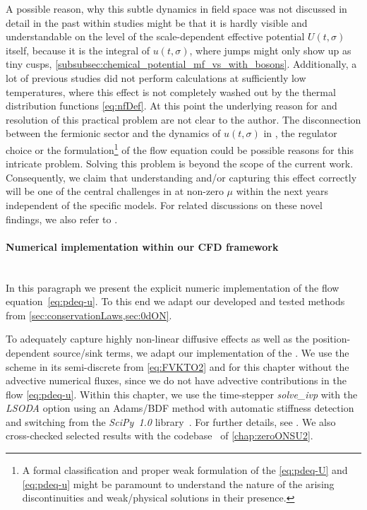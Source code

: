 A possible reason, why this subtle dynamics in field space was not discussed in detail in the past within \frg{} studies might be that it is hardly visible and understandable on the level of the scale-dependent effective potential $U ( t, \sigma )$ itself, because it is the integral of $u ( t, \sigma )$, where jumps might only show up as tiny cusps, \cf{} \cref{subsubsec:chemical_potential_mf_vs_with_bosons}.
Additionally, a lot of previous studies did not perform calculations at sufficiently low temperatures, where this effect is not completely washed out by the thermal distribution functions \eqref{eq:nfDef}.
At this point the underlying reason for and resolution of this practical problem are not clear to the author.
The disconnection between the fermionic sector and the dynamics of $u(t,\sigma)$ in \lpa{}, the regulator choice or the formulation\footnote{A formal classification and proper weak formulation of the \pdes{} \eqref{eq:pdeq-U} and \eqref{eq:pdeq-u} might be paramount to understand the nature of the arising discontinuities and weak/physical solutions in their presence.} of the flow equation could be possible reasons for this intricate problem.
Solving this problem is beyond the scope of the current work. 
Consequently, we claim that understanding and/or capturing this effect correctly will be one of the central challenges in \frg{} at non-zero $\mu$ within the next years \dash{} independent of the specific models.
For related discussions on these novel findings, we also refer to .

\paragraph{Numerical implementation within our CFD framework}\label{paragraph:GNYKTnum}\mbox{}\\%
In this paragraph we present the explicit numeric implementation of the \frg{} flow equation~\eqref{eq:pdeq-u}.
To this end we adapt our developed and tested methods from \cref{sec:conservationLaws,sec:0dON}.

To adequately capture highly non-linear diffusive effects as well as the position-dependent source/sink terms, we adapt our implementation of the \ktScheme{}.
We use the scheme in its semi-discrete from \eqref{eq:FVKTO2} and for this chapter without the advective numerical fluxes, since we do not have advective contributions in the flow \cref{eq:pdeq-u}.
Within this chapter, we use the time-stepper \textit{solve\_ivp} with the \textit{LSODA} option using an Adams/BDF method with automatic stiffness detection and switching from the \textit{SciPy~1.0} library~\cite{2020SciPy-NMeth}.
For further details, see \gnAppNum{}.
We also cross-checked selected results with the \WAM{} codebase~\cite{Steil:2023zeroD,Steil:2023zeroDN1,Steil:2023zeroDlargeN,Steil:2023PhDFVNB} of \cref{chap:zeroONSU2}.
	
